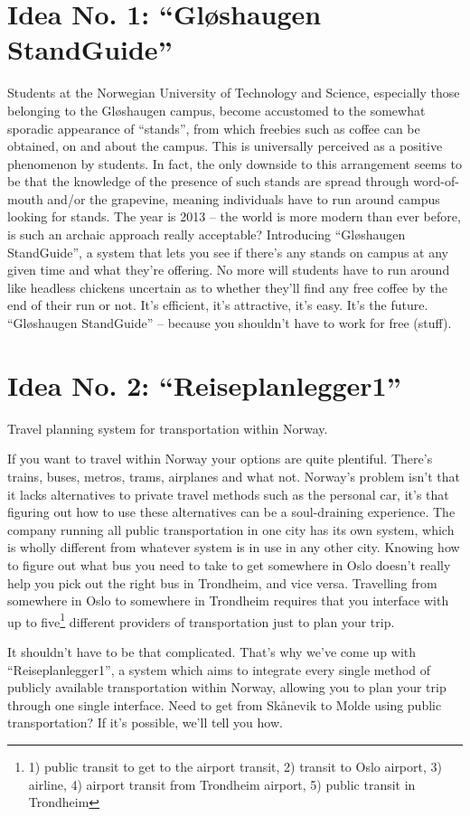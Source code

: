 \section{Idea No. 1: ``Gløshaugen StandGuide''}
	Students at the Norwegian University of Technology and Science, 
	especially those belonging to the Gløshaugen campus, 
	become accustomed to the somewhat sporadic appearance of ``stands'', 
	from which freebies such as coffee can be obtained, on and about the campus.
	This is universally perceived as a positive phenomenon by students.
	In fact, the only downside to this arrangement seems to be that the knowledge of the presence of such stands are spread through word-of-mouth and/or the grapevine,
	meaning individuals have to run around campus looking for stands.
	The year is 2013 -- the world is more modern than ever before, 
	is such an archaic approach really acceptable?
	Introducing ``Gløshaugen StandGuide'', a system that lets you see if there's any stands on campus at any given time and what they're offering.
	No more will students have to run around like headless chickens uncertain as to whether they'll find any free coffee by the end of their run or not.
	It's efficient, it's attractive, it's easy.
	It's the future.
	``Gløshaugen StandGuide'' -- because you shouldn't have to work for free (stuff).

\section{Idea No. 2: ``Reiseplanlegger1''}
	Travel planning system for transportation within Norway.

	If you want to travel within Norway your options are quite plentiful.
	There's trains, buses, metros, trams, airplanes and what not.
	Norway's problem isn't that it lacks alternatives to private travel methods such as the personal car, 
	it's that figuring out how to use these alternatives can be a soul-draining experience.
	The company running all public transportation in one city has its own system,
	which is wholly different from whatever system is in use in any other city.
	Knowing how to figure out what bus you need to take to get somewhere in Oslo doesn't really help you pick out the right bus in Trondheim, and vice versa.
	Travelling from somewhere in Oslo to somewhere in Trondheim requires that you interface with up to five\footnote{1) public transit to get to the airport transit, 2) transit to Oslo airport, 3) airline, 4) airport transit from Trondheim airport, 5) public transit in Trondheim} different providers of transportation just to plan your trip.

	It shouldn't have to be that complicated.
	That's why we've come up with ``Reiseplanlegger1'',
	a system which aims to integrate every single method of publicly available transportation within Norway, 
	allowing you to plan your trip through one single interface. 
	Need to get from Skånevik to Molde using public transportation?
	If it's possible, we'll tell you how.